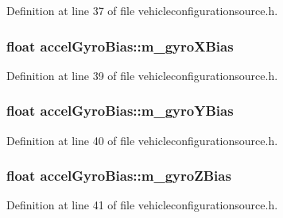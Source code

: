 \-Definition at line 37 of file vehicleconfigurationsource.\-h.

\hypertarget{group___vehicle_configuration_source_ga483a0631083ce446a08b73ecc712ed73}{
\subsubsection[{m\-\_\-gyro\-X\-Bias}]{\setlength{\rightskip}{0pt plus 5cm}float {\bf accel\-Gyro\-Bias\-::m\-\_\-gyro\-X\-Bias}}}\label{group___vehicle_configuration_source_ga483a0631083ce446a08b73ecc712ed73}


\-Definition at line 39 of file vehicleconfigurationsource.\-h.

\hypertarget{group___vehicle_configuration_source_gade8f76b5b608f6446cb182c372598e53}{
\subsubsection[{m\-\_\-gyro\-Y\-Bias}]{\setlength{\rightskip}{0pt plus 5cm}float {\bf accel\-Gyro\-Bias\-::m\-\_\-gyro\-Y\-Bias}}}\label{group___vehicle_configuration_source_gade8f76b5b608f6446cb182c372598e53}


\-Definition at line 40 of file vehicleconfigurationsource.\-h.

\hypertarget{group___vehicle_configuration_source_ga637101f3cecb351e7fe8d6106dd50d15}{
\subsubsection[{m\-\_\-gyro\-Z\-Bias}]{\setlength{\rightskip}{0pt plus 5cm}float {\bf accel\-Gyro\-Bias\-::m\-\_\-gyro\-Z\-Bias}}}\label{group___vehicle_configuration_source_ga637101f3cecb351e7fe8d6106dd50d15}


\-Definition at line 41 of file vehicleconfigurationsource.\-h.

